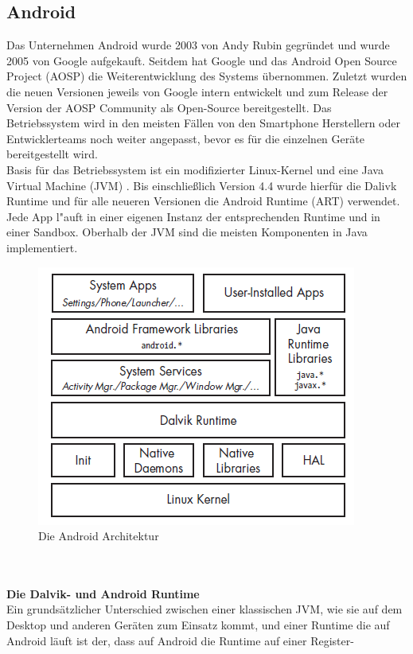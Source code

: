 \subsection{Android}
	Das Unternehmen Android wurde 2003 von Andy Rubin gegründet und wurde 2005 von
	Google aufgekauft. Seitdem hat Google und das Android Open Source Project
	(AOSP) die Weiterentwicklung des Systems übernommen. Zuletzt wurden die neuen
	Versionen jeweils von Google intern entwickelt und zum Release der Version der
	AOSP Community als Open-Source bereitgestellt. Das Betriebssystem wird in den
	meisten Fällen von den Smartphone Herstellern oder Entwicklerteams noch weiter
	angepasst, bevor es für die einzelnen Geräte bereitgestellt wird.\\
	Basis für das Betriebssystem ist ein modifizierter Linux-Kernel und eine Java
	Virtual Machine (JVM) \cite{ArtDalvik}. Bis einschließlich Version 4.4 wurde
	hierfür die Dalivk Runtime und für alle neueren Versionen die Android Runtime
	(ART) verwendet. Jede App l"auft in einer eigenen Instanz der entsprechenden
	Runtime und in einer Sandbox. Oberhalb der JVM sind die meisten Komponenten in
	Java implementiert.
	\begin{figure}[h]
		\centering
		\includegraphics[width=0.7\linewidth]{android_pages/graphics/architektur_android_.png}
		\caption{Die Android Architektur \protect\cite[S. 2]{Elenkov2014} }
		\label{fig:architektur_android}
	\end{figure}
	\\\\
	\textbf{Die Dalvik- und Android Runtime}\\
	Ein grundsätzlicher Unterschied zwischen einer klassischen JVM, wie sie auf
	dem Desktop und anderen Geräten zum Einsatz kommt, und einer Runtime die auf
	Android läuft ist der, dass auf Android die Runtime auf einer Register-
